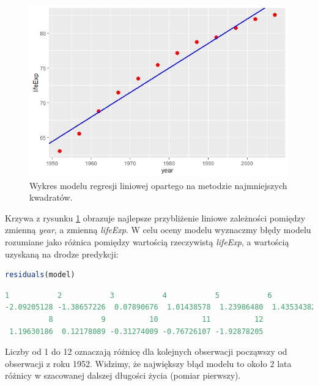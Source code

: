 \documentclass[a4paper]{article}
\begin{document}
\begin{figure}[ht]
    \centering
    \includegraphics[width = 250 pt, height = 200 pt]{KRZYWA_REGRESJI.jpeg}
    \caption{Wykres modelu regresji liniowej opartego na metodzie najmniejszych kwadratów.}
    \label{r(2.4)}
\end{figure}
Krzywa z rysunku \ref{r(2.4)} obrazuje najlepsze przybliżenie liniowe zależności pomiędzy zmienną \textit{year}, a zmienną \textit{lifeExp}. W celu oceny modelu wyznaczmy błędy modelu rozumiane jako różnica pomiędzy wartością rzeczywistą \textit{lifeExp}, a wartością uzyskaną na drodze predykcji: 
\begin{lstlisting}[language=R, frame=single ]
residuals(model)
\end{lstlisting}
\begin{lstlisting}[language=R, frame=single ]
          1           2           3           4           5           6           7 
-2.09205128 -1.38657226  0.07890676  1.01438578  1.23986480  1.43534382  1.40082284 
          8           9          10          11          12 
 1.19630186  0.12178089 -0.31274009 -0.76726107 -1.92878205 
\end{lstlisting}
Liczby od 1 do 12 oznaczają różnicę dla kolejnych obserwacji począwszy od obserwacji z roku 1952. Widzimy, że największy błąd modelu to około 2 lata różnicy w szacowanej dalszej długości życia (pomiar pierwszy).
\end{document}
